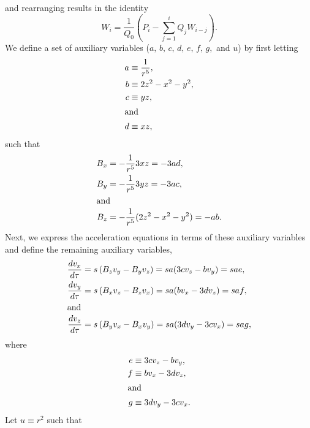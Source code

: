\documentclass[draft]{agujournal2019}
\begin{document}
and rearranging results in the identity
        \begin{equation}
            W_i=\frac{1}{Q_0}\left(P_i-\sum_{j=1}^i Q_jW_{i-j}\right).
            \label{EQN: Cauchy a/b}
        \end{equation}
We define a set of auxiliary variables ($a,\,b,\,c,\,d,\,e,\,f,\,g,$ and $u$) by first letting
        \begin{align*}
            a &\equiv \frac{1}{r^5}, \\
            b &\equiv 2z^2-x^2-y^2, \\
            c &\equiv yz,\\
         \intertext{and}
            d &\equiv xz,
        \end{align*}
such that
        \begin{align*}
           B_x&=-\frac{1}{r^5}3xz=-3ad,\\
           B_y&=-\frac{1}{r^5}3yz=-3ac,\\
         \intertext{and}
            B_z&=-\frac{1}{r^5}(2z^2-x^2-y^2)=-ab.
        \end{align*}
Next, we express the acceleration equations in terms of these auxiliary variables and define the remaining auxiliary variables,
        \begin{align*}
            \frac{dv_x}{d\tau} &= s\left(B_z v_y - B_y v_z\right)
            = sa(3c v_z - b v_y) = sae, \\
            \frac{dv_y}{d\tau} &= s\left(B_x v_z - B_z v_x\right)
            = sa(b v_x - 3d v_z) = saf, \\
         \intertext{and}
            \frac{dv_z}{d\tau} &= s\left(B_y v_x - B_x v_y\right)
            = sa(3d v_y - 3c v_x) = sag,
        \end{align*}
where
        \begin{align*}
            e &\equiv 3c v_z - b v_y, \\
            f &\equiv b v_x - 3d v_z, \\
         \intertext{and}
            g &\equiv 3d v_y - 3c v_x.
        \end{align*}
Let $u\equiv r^2$ such that
\end{document}
